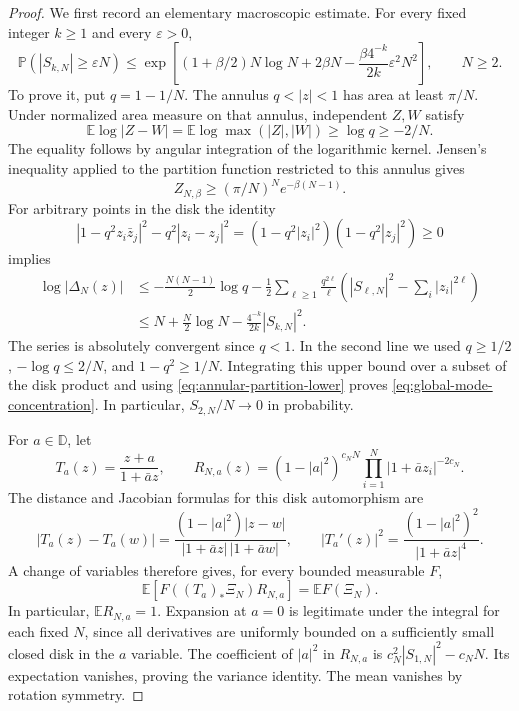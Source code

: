 \documentclass[11pt,a4paper]{article}
\numberwithin{equation}{section}
\theoremstyle{definition}
\theoremstyle{remark}
\begin{document}
\begin{proof}
We first record an elementary macroscopic estimate. For every fixed integer
$k\ge1$ and every $\varepsilon>0$,
\begin{equation}\label{eq:global-mode-concentration}
 \mathbb P(|S_{k,N}|\ge\varepsilon N)
 \le \exp\left[
 (1+\beta/2)N\log N+2\beta N
 -\frac{\beta4^{-k}}{2k}\varepsilon^2N^2\right],\qquad N\ge2.
\end{equation}
To prove it, put $q=1-1/N$. The annulus $q<|z|<1$ has area at least
$\pi/N$. Under normalized area measure on that annulus, independent
$Z,W$ satisfy
\[
 \mathbb E\log|Z-W|
 =\mathbb E\log\max(|Z|,|W|)\ge\log q\ge-2/N.
\]
The equality follows by angular integration of the logarithmic kernel.
Jensen's inequality applied to the partition function restricted to this
annulus gives
\begin{equation}\label{eq:annular-partition-lower}
 Z_{N,\beta}\ge(\pi/N)^N e^{-\beta(N-1)}.
\end{equation}
For arbitrary points in the disk the identity
\[
 |1-q^2z_i\bar z_j|^2-q^2|z_i-z_j|^2
 =(1-q^2|z_i|^2)(1-q^2|z_j|^2)\ge0
\]
implies
\begin{align*}
 \log|\Delta_N(z)|
 &\le-\frac{N(N-1)}2\log q
   -\frac12\sum_{\ell\ge1}\frac{q^{2\ell}}\ell
       \left(|S_{\ell,N}|^2-\sum_i|z_i|^{2\ell}\right)\\
 &\le N+\frac N2\log N-\frac{4^{-k}}{2k}|S_{k,N}|^2.
\end{align*}
The series is absolutely convergent since $q<1$. In the second line we
used $q\ge1/2$, $-\log q\le2/N$, and
$1-q^2\ge1/N$. Integrating this upper bound over a subset of the disk
product and using \eqref{eq:annular-partition-lower} proves
\eqref{eq:global-mode-concentration}. In particular,
$S_{2,N}/N\to0$ in probability.

For $a\in\mathbb D$, let
\[
 T_a(z)=\frac{z+a}{1+\bar az},\qquad
 R_{N,a}(z)=
 (1-|a|^2)^{c_NN}\prod_{i=1}^N|1+\bar az_i|^{-2c_N}.
\]
The distance and Jacobian formulas for this disk automorphism are
\[
 |T_a(z)-T_a(w)|
 =\frac{(1-|a|^2)|z-w|}{|1+\bar az|\,|1+\bar aw|},\qquad
 |T_a'(z)|^2=\frac{(1-|a|^2)^2}{|1+\bar az|^4}.
\]
A change of variables therefore gives, for every bounded measurable $F$,
\begin{equation}\label{eq:mobius-exact-test}
 \mathbb E\left[F((T_a)_*\Xi_N)R_{N,a}\right]
 =\mathbb EF(\Xi_N).
\end{equation}
In particular, $\mathbb ER_{N,a}=1$. Expansion at $a=0$ is legitimate
under the integral for each fixed $N$, since all derivatives are uniformly
bounded on a sufficiently small closed disk in the $a$ variable. The
coefficient of $|a|^2$ in $R_{N,a}$ is
$c_N^2|S_{1,N}|^2-c_NN$. Its expectation vanishes, proving the variance
identity. The mean vanishes by rotation symmetry.


\end{proof}
\end{document}

